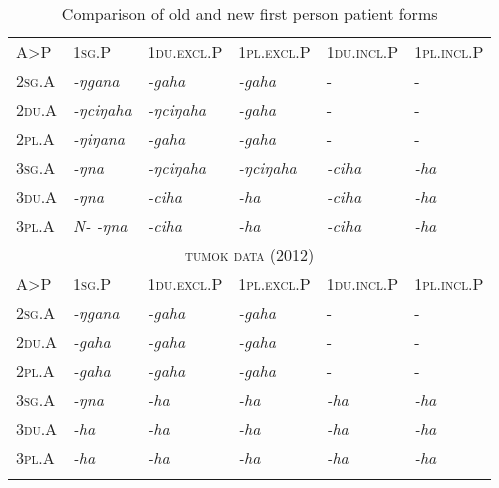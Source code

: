 \begin{table}[htp]
\begin{tabular}{llllll}
\lsptoprule
\multicolumn{6}{c}{{\scshape omruwa data (1984)}} \\
\midrule
	A>P			& {\scshape 1sg.P}		&{\scshape 1du.excl.P} &{\scshape 1pl.excl.P}		&{\scshape 1du.incl.P} &{\scshape 1pl.incl.P}	\\
\midrule                                                                    
{\scshape 2sg.A}&\emph{-ŋgana}	&\emph{-gaha}	&\emph{-gaha}			 & -					 &-						\\
{\scshape 2du.A}&\emph{-ŋciŋaha}	&\emph{-ŋciŋaha} &\emph{-gaha}			 & -					 &-						\\
{\scshape 2pl.A}&\emph{-ŋiŋana}	&\emph{-gaha}	&\emph{-gaha}			  & -					&-						\\
{\scshape 3sg.A}&\emph{-ŋna}		&\emph{-ŋciŋaha}	 &\emph{-ŋciŋaha}	&  \emph{-ciha}& \emph{-ha}		\\
{\scshape 3du.A}&\emph{-ŋna}		&\emph{-ciha}	&\emph{-ha}				&  \emph{-ciha}& \emph{-ha}		\\
{\scshape 3pl.A}&\emph{N- -ŋna}	&\emph{-ciha}	&\emph{-ha}			&	  \emph{-ciha}& \emph{-ha}	\\
\midrule
\multicolumn{6}{c}{{\scshape tumok data (2012)}} \\
\midrule
	A>P			& {\scshape 1sg.P}&		{\scshape 1du.excl.P}&{\scshape 1pl.excl.P}	& {\scshape 1du.incl.P} &{\scshape 1pl.incl.P}	\\
\midrule                                                             
{\scshape 2sg.A}&\emph{-ŋgana}	&\emph{-gaha	}	&\emph{-gaha}		&-					&-						\\
{\scshape 2du.A}&\emph{-gaha}		&\emph{-gaha	}	&\emph{-gaha}		&-					&-						\\
{\scshape 2pl.A}&\emph{-gaha}		&\emph{-gaha	}	&\emph{-gaha}		&-					&-						\\
{\scshape 3sg.A}&\emph{-ŋna}		&\emph{-ha}	&\emph{-ha}			&\emph{-ha}	&\emph{-ha}	\\
{\scshape 3du.A}&\emph{-ha}			&\emph{-ha}	&\emph{-ha}			&\emph{-ha}	&\emph{-ha}	\\
{\scshape 3pl.A}&\emph{-ha}			&\emph{-ha}	&\emph{-ha}			&\emph{-ha}	&\emph{-ha}	\\
\lspbottomrule
\end{tabular}\\
\caption{Comparison of old and new first person patient forms}\label{omruwa}
\end{table}

